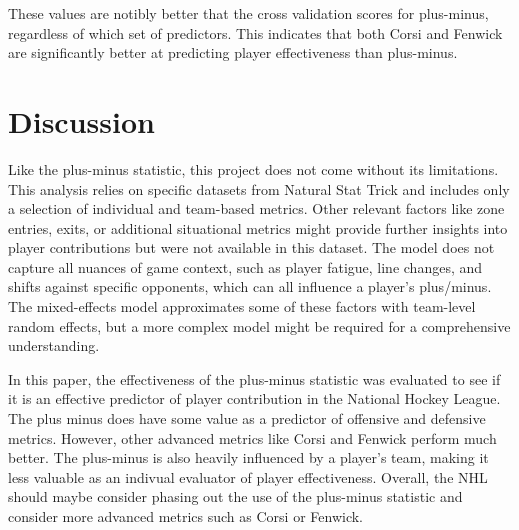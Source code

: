 \documentclass[12pt]{article}
\begin{document}
These values are notibly better that the cross validation scores for plus-minus, regardless of which set of predictors. This indicates
that both Corsi and Fenwick are significantly better at predicting player effectiveness than plus-minus.


\section{Discussion}
\label{sec:disc}

Like the plus-minus statistic, this project does not come without its limitations. This analysis relies on specific datasets from 
Natural Stat Trick and includes only a selection of individual and team-based metrics. Other relevant factors like zone entries, exits, or 
additional situational metrics might provide further insights into player contributions but were not available in this dataset. The model 
does not capture all nuances of game context, such as player fatigue, line changes, and shifts against specific opponents, which can all 
influence a player’s plus/minus. The mixed-effects model approximates some of these factors with team-level random effects, but a more 
complex model might be required for a comprehensive understanding.

In this paper, the effectiveness of the plus-minus statistic was evaluated to see if it is an effective predictor of player contribution
in the National Hockey League. The plus minus does have some value as a predictor of offensive and defensive metrics. However, other
advanced metrics like Corsi and Fenwick perform much better. The plus-minus is also heavily influenced by a player's team, making it 
less valuable as an indivual evaluator of player effectiveness. Overall, the NHL should maybe consider phasing out the use of the plus-minus
statistic and consider more advanced metrics such as Corsi or Fenwick.




\end{document}
